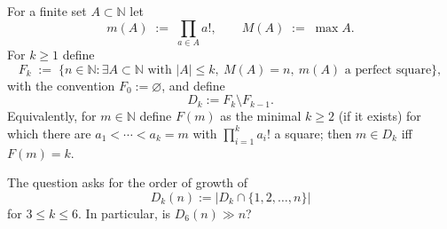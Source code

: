For a finite set $A\subset \mathbb{N}$ let
\[
  m(A)\;:=\;\prod_{a\in A} a!,\qquad M(A)\;:=\;\max A.
\]
For $k\ge 1$ define
\[
  F_k\;:=\;\bigl\{n\in\mathbb{N}:\exists A\subset\mathbb{N}\text{ with }|A|\le k,\ M(A)=n,\ m(A)\text{ a perfect square}\bigr\},
\]
with the convention $F_0:=\varnothing$, and define
\[
  D_k:=F_k\setminus F_{k-1}.
\]
Equivalently, for $m\in\mathbb{N}$ define $F(m)$ as the minimal $k\ge 2$ (if it exists) for which there are
$a_1<\cdots<a_k=m$ with $\prod_{i=1}^k a_i!$ a square; then $m\in D_k$ iff $F(m)=k$.

The question asks for the order of growth of
\[
D_k(n):=|D_k\cap\{1,2,\dots,n\}|
\]
for $3\le k\le 6$. In particular, is $D_6(n)\gg n$?
